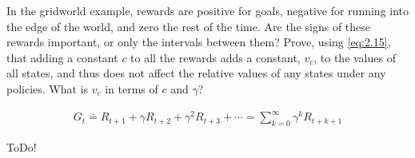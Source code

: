
\begin{exercise}[Exercise 3.15]

In the gridworld example, rewards are positive for goals, negative for running into the edge of the world, and zero the rest of the time.
Are the signs of these rewards important, or only the intervals between them?
Prove, using \eqref{eq:2.15}, that adding a constant $c$ to all the rewards adds a constant, $v_c$, to the values of all states, and thus does not affect the relative values of any states under any policies.
What is $v_c$ in terms of $c$ and $\gamma$?

\begin{align} \label{eq:2.15}
    G_t
    \doteq
    R_{t+1} + \gamma R_{t+2} + \gamma^2 R_{t+3} + \cdots
    =
    \sum_{k=0}^\infty
        \gamma^k R_{t+k+1}
\end{align}

\end{exercise}


\begin{solution}

ToDo!

\end{solution}

